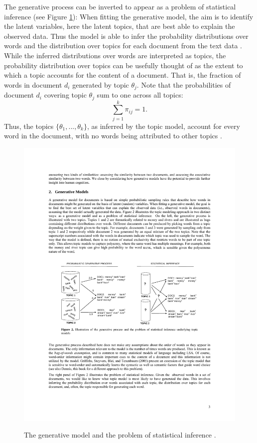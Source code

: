 \documentclass[11pt,a4paper,english,oneside]{book}
\numberwithin{equation}{chapter}
\begin{document}
The generative process can be inverted to appear as a problem of statistical inference (see Figure \ref{genproc}): When fitting the generative model, the aim is to identify the latent variables, here the latent topics, that are best able to explain the observed data. Thus the model is able to infer the probability distributions over words and the distribution over topics for each document from the text data \cite[~p. 3]{Steyvers(2007)}. While the inferred distributions over words are interpreted as topics, the probability distribution over topics can be usefully thought of as the extent to which a topic accounts for the content of a document. That is, the fraction of words in document $d_i$ generated by topic $\theta_j$. Note that the probabilities of document $d_i$ covering topic $\theta_{j}$ sum to one across all topics:
$$
\sum_{j=1}^{k} \pi_{ij} = 1.
$$
Thus, the topics $\{\theta_1, ..., \theta_k\}$, as inferred by the topic model, account for every word in the document, with no words being attributed to other topics \cite[pp.~338]{Zhai.2016}. 

\begin{figure}
	\caption{The generative model and the problem of statistical inference \cite[p.3]{Steyvers(2007)}.}
	\centering
	\includegraphics[scale=1]{Images/genproc.pdf}
	\label{genproc}
\end{figure}
\end{document}
